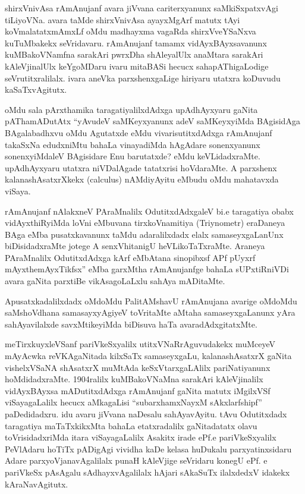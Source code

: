 shirxVnivAsa rAmAnujanf avara jiVvana cariterxyanunx saMkiSxpatxvAgi tiLiyoVNa. avara taMde shirxVnivAsa ayayxMgArf matutx tAyi koVmalatatxmAmxLf oMdu madhayxma vagaRda shirxVveYSaNxva kuTuMbakekx seVridavaru. rAmAnujanf tamamx vidAyxBAyxsavanunx kuMBakoVNamfna sarakAri pwrxDha shAleyalUlx anaMtara sarakAri kAleVjinalUlx keYgoMDaru ivaru mitaBASi hecucx sahapAThigaLodige seVrutitxralilalx. ivara aneVka parxshenxgaLige hiriyaru utatxra koDuvudu kaSaTxvAgitutx.

oMdu sala pArxthamika taragatiyalilxdAdxga upAdhAyxyaru gaNita pAThamADutAtx ``yAvudeV saMKeyxyanunx adeV saMKeyxyiMda BAgisidAga BAgalabadhxvu oMdu Agutatxde eMdu vivarisutitxdAdxga rAmAnujanf takaSxNa edudxniMtu bahaLa vinayadiMda hAgAdare sonenxyanunx sonenxyiMdaleV BAgisidare Enu barutatxde? eMdu keVLidadxraMte. upAdhAyxyaru utatxra niVDalAgade tatatxrisi hoVdaraMte. A parxshenx kalanashAsatxrXkekx {\rm (calculus)} nAMdiyAyitu eMbudu oMdu mahatavxda viSaya. 

rAmAnujanf nAlakxneV PAraMnalilx OdutitxdAdxgaleV bi.e taragatiya obabx vidAyxthiRyiMda loVni eMbuvana tirxkoVnamitiya {\rm (Triynometr)} eraDaneya BAga eMba pusatxkavanunx taMdu adaralilxdadx elalx samaseyxgaLanUnx biDisidadxraMte jotege A senxVhitanigU heVLikoTaTxraMte. Araneya PAraMnalilx OdutitxdAdxga kArf eMbAtana sinopibxsf APf pUyxrf mAyxthemAyxTikfsx'' eMba garxMtha rAmAnujanfge bahaLa sUPxtiRniVDi avara gaNita parxtiBe vikAsagoLaLxlu sahAya mADitaMte.

Apusatxkadalilxdadx oMdoMdu PalitAMshavU rAmAnujana avarige oMdoMdu saMshoVdhana samasayxyAgiyeV toVritaMte aMtaha samaseyxgaLanunx yAra sahAyavilalxde savxMtikeyiMda biDisuva haTa avaradAdxgitatxMte.

meTirxkuyxleVSanf pariVkeSxyalilx utitxVNaRrAguvudakekx muMceyeV mAyAcwka reVKAgaNitada kilxSaTx samaseyxgaLu, kalanashAsatxrX gaNita vishelxVSaNA shAsatxrX muMtAda keSxVtarxgaLAlilx pariNatiyanunx hoMdidadxraMte. {\rm 1904}ralilx kuMBakoVNaMna sarakAri kAleVjinalilx vidAyxBAyxsa mADutitxdAdxga rAmAnujanf gaNita matutx iMgilxVSf viSayagaLalilx hecucx aMkagaLisi ``subarxhamxNayxM sAkxlarfshipf'' paDedidadxru. idu avaru jiVvana naDesalu sahAyavAyitu. tAvu Odutitxdadx taragatiya maTaTxkikxMta bahaLa etatxradalilx gaNitadatatx olavu toVrisidadxriMda itara viSayagaLalilx Asakitx irade ePf.e pariVkeSxyalilx PeVlAdaru hoTiTx pADigAgi vividha kaDe kelasa huDukalu parxyatinxsidaru Adare parxyoVjanavAgalilalx punaH kAleVjige seVridaru konegU ePf. e pariVkeSx pAsAgalu sAdhayxvAgalilalx hAjari sAkaSuTx ilalxdedxV idakekx kAraNavAgitutx.

